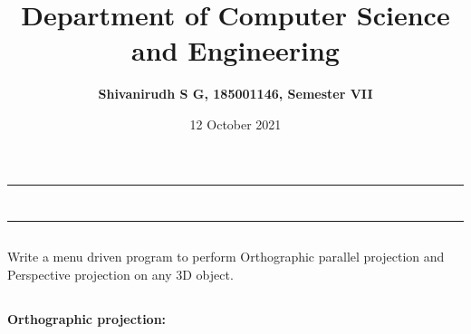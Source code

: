 \documentclass[9pt,letterpaper]{article}
\title{\textbf{Department of Computer Science and Engineering}}
\author{\textbf{Shivanirudh S G, 185001146, Semester VII }}
\date{12 October 2021}
\begin{document}
\maketitle
\hrule
\section*{}
\hrule 
\bigskip\bigskip

\subsection*{}

\subsection*{}
\begin{flushleft}
    Write a menu driven program to perform Orthographic parallel projection and Perspective projection on any 3D object.
\end{flushleft}

\subsection*{}
\begin{flushleft}




\end{flushleft}
\newpage
\subsection*{}
\textbf{Orthographic projection:}\\
\end{document}
